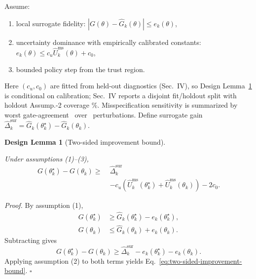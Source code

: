 \documentclass[letterpaper,10pt,conference]{ieeeconf}
\newtheorem{designlemma}{Design Lemma}
\begin{document}
Assume:
\begin{enumerate}
\item local surrogate fidelity: $|G(\theta)-\hat{G}_k(\theta)| \le e_k(\theta)$,
\item uncertainty dominance with empirically calibrated constants: $e_k(\theta) \le c_u \widehat{U}^{\mathrm{ms}}_k(\theta)+c_0$,
\item bounded policy step from the trust region.
\end{enumerate}
Here \((c_u,c_0)\) are fitted from held-out diagnostics (Sec.~IV), so Design Lemma~\ref{dlm:two-sided-bound} is conditional on calibration; Sec.~IV reports a disjoint fit/holdout split with holdout Assump.-2 coverage \CoreUncertaintyCoveragePct\%. Misspecification sensitivity is summarized by worst gate-agreement \CoreUncertaintyMisspecWorstAgreement\ over \CoreUncertaintyMisspecGridN\ perturbations.
Define surrogate gain $\hat{\Delta}_k^{\mathrm{sur}} = \hat{G}_k(\theta_k^\star)-\hat{G}_k(\theta_k)$.
\begin{designlemma}[Two-sided improvement bound]
\label{dlm:two-sided-bound}
\par Under assumptions (1)--(3),
\begin{equation}
\begin{aligned}
G(\theta_k^\star)-G(\theta_k)
\ge\;&\hat{\Delta}_k^{\mathrm{sur}} \\
&- c_u\!\left(\widehat{U}^{\mathrm{ms}}_k(\theta_k^\star)+\widehat{U}^{\mathrm{ms}}_k(\theta_k)\right)-2c_0.
\end{aligned}
\label{eq:two-sided-improvement-bound}
\end{equation}
\end{designlemma}
\noindent\textit{Proof.}
By assumption (1),
\[
\begin{aligned}
G(\theta_k^\star) &\ge \hat{G}_k(\theta_k^\star)-e_k(\theta_k^\star),\\
G(\theta_k) &\le \hat{G}_k(\theta_k)+e_k(\theta_k).
\end{aligned}
\]
Subtracting gives
\[
G(\theta_k^\star)-G(\theta_k)
\ge
\hat{\Delta}_k^{\mathrm{sur}}-e_k(\theta_k^\star)-e_k(\theta_k).
\]
Applying assumption (2) to both terms yields Eq.~\ref{eq:two-sided-improvement-bound}.
\hfill$\square$
\end{document}
